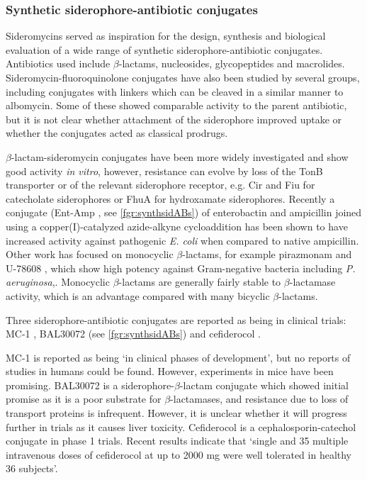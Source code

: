 \subsubsection{Synthetic siderophore-antibiotic conjugates\label{sec:synthsidABs}}

Sideromycins served as inspiration for the design, synthesis and biological evaluation of a wide range of synthetic siderophore-antibiotic conjugates\cite{Page2013}. Antibiotics used include $\beta$-lactams\cite{Mollmann2009,Dini2000,Kline2000}, nucleosides\cite{Lu1999}, glycopeptides\cite{Ghosh1996} and macrolides\cite{Ghosh1995}. Sideromycin-fluoroquinolone conjugates have also been studied by several groups\cite{Md-Saleh2009,Rivault2007,Ji2012}, including conjugates with linkers which can be cleaved\cite{Rivault2007,Ji2012} in a similar manner to albomycin\cite{Hartmann1979}. Some of these showed comparable activity to the parent antibiotic, but it is not clear whether attachment of the siderophore improved uptake or whether the conjugates acted as classical prodrugs.

$\beta$-lactam-sideromycin conjugates have been more widely investigated and show good activity \textit{in vitro}, however, resistance can evolve by loss of the TonB transporter or of the relevant siderophore receptor, e.g. Cir and Fiu for catecholate siderophores or FhuA for hydroxamate siderophores\cite{Page2013}. 
Recently a conjugate (Ent-Amp , see \ref{fgr:synthsidABs}) of enterobactin and ampicillin joined using a copper(I)-catalyzed azide-alkyne cycloaddition has been shown to have increased activity against pathogenic \textit{E. coli} when compared to native ampicillin\cite{Zheng2014}. 
Other work has focused on monocyclic $\beta$-lactams, for example pirazmonam  and U-78608 , which show high potency against Gram-negative bacteria including \textit{P. aeruginosa},\cite{Zurenko1990,Harrington2012}. Monocyclic $\beta$-lactams are generally fairly stable to $\beta$-lactamase activity, which is an advantage compared with many bicyclic $\beta$-lactams.

Three siderophore-antibiotic conjugates are reported as being in clinical trials\cite{Schalk2017}: MC-1 \cite{McPherson2012}, BAL30072 \cite{Page2013} (see \ref{fgr:synthsidABs}) and cefiderocol \cite{Ito2018,Saisho2018}.

MC-1  is reported as being `in clinical phases of development'\cite{Schalk2017}, but no reports of studies in humans could be found. However, experiments in mice have been promising\cite{McPherson2012}.
BAL30072  is a siderophore-$\beta$-lactam conjugate which showed initial promise as it is a poor substrate for $\beta$-lactamases, and resistance due to loss of transport proteins is infrequent\cite{Page2013}. However, it is unclear whether it will progress further in trials as it causes liver toxicity\cite{Paech2017}. 
Cefiderocol  is a cephalosporin-catechol conjugate in phase 1 trials. Recent results indicate that `single and 35 multiple intravenous doses of cefiderocol at up to 2000 mg were well tolerated in healthy 36 subjects'\cite{Saisho2018}.

